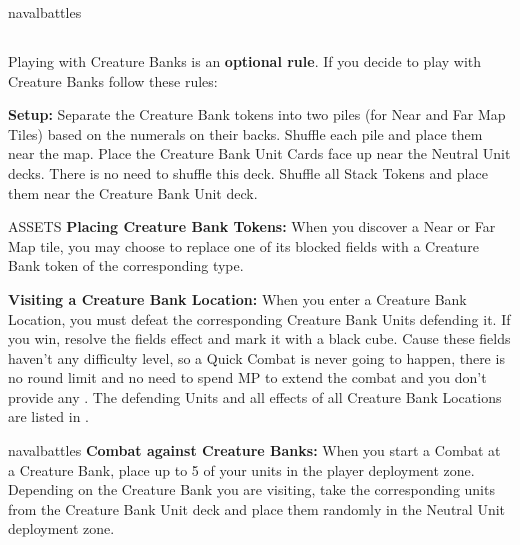 \begin{multicols*}{2}
\vspace*{\fill}

\begin{expansion}[before=\vspace*{0pt}]{navalbattles}
  \subsection*{}
  Playing with Creature Banks is an \textbf{optional rule}.
  If you decide to play with Creature Banks follow these rules:\par
  \vspace*{1em}
  \textbf{Setup:} Separate the Creature Bank tokens into two piles (for Near and Far Map Tiles) based on the numerals on their backs.
  Shuffle each pile and place them near the map.
  Place the Creature Bank Unit Cards face up near the Neutral Unit decks.
  There is no need to shuffle this deck.
  Shuffle all Stack Tokens and place them near the Creature Bank Unit deck.
  \vspace*{1em}

  ASSETS %
  \textbf{Placing Creature Bank Tokens:} When you discover a Near or Far Map tile, you may choose to replace one of its blocked fields with a Creature Bank token of the corresponding type.\par
  \vspace*{1em}
  \textbf{Visiting a Creature Bank Location:} When you enter a Creature Bank Location, you must defeat the corresponding Creature Bank Units defending it.
  If you win, resolve the fields effect and mark it with a black cube.
  Cause these fields haven't any difficulty level, so a Quick Combat is never going to happen, there is no round limit and no need to spend MP to extend the combat and you don't provide any .
  The defending Units and all effects of all Creature Bank Locations are listed in .
  \vspace*{1em}
  \end{expansion}
  \begin{expansion}{navalbattles}
  \textbf{Combat against Creature Banks:} When you start a Combat at a Creature Bank, place up to 5 of your units in the player deployment zone.
  Depending on the Creature Bank you are visiting, take the corresponding units from the Creature Bank Unit deck and place them randomly in the Neutral Unit deployment zone.


\end{expansion}
\end{multicols*}
